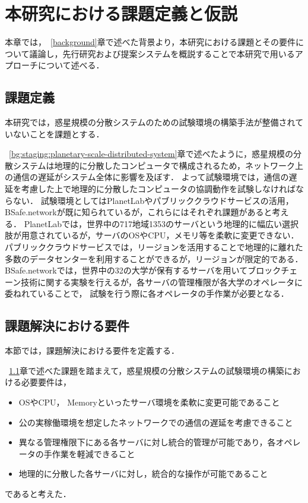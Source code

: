 \chapter{本研究における課題定義と仮説}
\label{issue}

本章では，~\ref{background}章で述べた背景より，本研究における課題とその要件について議論し，先行研究および提案システムを概説することで本研究で用いるアプローチについて述べる．

\section{課題定義}
\label{issue:definition}

本研究では，惑星規模の分散システムのための試験環境の構築手法が整備されていないことを課題とする．

~\ref{bg:staging:planetary-scale-distributed-system}章で述べたように，惑星規模の分散システムは地理的に分散したコンピュータで構成されるため，ネットワーク上の通信の遅延がシステム全体に影響を及ぼす．
よって試験環境では，通信の遅延を考慮した上で地理的に分散したコンピュータの協調動作を試験しなければならない．
試験環境としてはPlanetLabやパブリッククラウドサービスの活用，BSafe.networkが既に知られているが，これらにはそれぞれ課題があると考える．
PlanetLabでは，世界中の717地域1353のサーバという地理的に幅広い選択肢が用意されているが，サーバのOSやCPU，メモリ等を柔軟に変更できない．
パブリッククラウドサービスでは，リージョンを活用することで地理的に離れた多数のデータセンターを利用することができるが，リージョンが限定的である．
BSafe.networkでは，世界中の32の大学が保有するサーバを用いてブロックチェーン技術に関する実験を行えるが，各サーバの管理権限が各大学のオペレータに委ねれていることで，
試験を行う際に各オペレータの手作業が必要となる．

\section{課題解決における要件}
\label{issue:requirements}

本節では，課題解決における要件を定義する．

~\ref{issue:definition}章で述べた課題を踏まえて，惑星規模の分散システムの試験環境の構築における必要要件は，
\begin{itemize}
  \item OSやCPU， Memoryといったサーバ環境を柔軟に変更可能であること
  \item 公の実稼働環境を想定したネットワークでの通信の遅延を考慮できること
  \item 異なる管理権限下にある各サーバに対し統合的管理が可能であり，各オペレータの手作業を軽減できること
  \item 地理的に分散した各サーバに対し，統合的な操作が可能であること
\end{itemize}
であると考えた．

